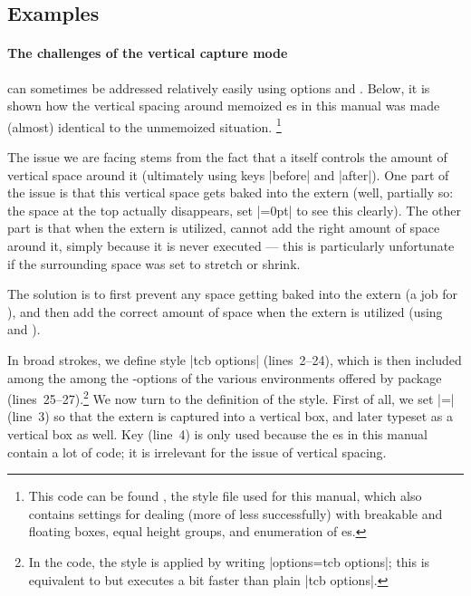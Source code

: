 \documentclass[a4paper,11pt]{article}
\begin{document}
\subsection{Examples}
\label{sec:examples}

\paragraph*{The challenges of the vertical capture mode} can sometimes be
addressed relatively easily using options  and
.  Below, it is shown how the vertical spacing around
memoized es in this manual was made (almost) identical to the
unmemoized situation.%
\footnote{This code can be found , the style file used
  for this manual, which also contains settings for dealing (more of less
  successfully) with breakable and floating boxes, equal height groups, and
  enumeration of es.}%

The issue we are facing stems from the fact that a  itself
controls the amount of vertical space around it (ultimately using keys |before|
and |after|).  One part of the issue is that this vertical space gets baked
into the extern (well, partially so: the space at the top actually disappears,
set |=0pt| to see this clearly).  The other part is that when
the extern is utilized,  cannot add the right amount of space
around it, simply because it is never executed --- this is particularly
unfortunate if the surrounding space was set to stretch or shrink.

The solution is to first prevent any space getting baked into the extern (a job
for ), and then add the correct amount of space
when the extern is utilized (using  and ).

In broad strokes, we define style |tcb options| (lines~2--24), which is then
included among the among the -options of the various environments
offered by package  (lines~25--27).\cprotect\footnote{In the
  code, the style is applied by writing |options=tcb options|; this is
  equivalent to but executes a bit faster than plain |tcb options|.}  We now
turn to the definition of the style.  First of all, we set
|=| (line~3) so that the extern is
captured into a vertical box, and later typeset as a vertical box as well.  Key
 (line~4) is only used because the es in this
manual contain a lot of code; it is irrelevant for the issue of vertical
spacing.
\end{document}
